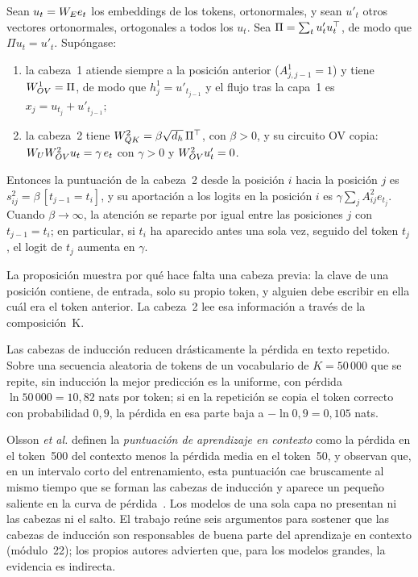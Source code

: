 \begin{proposicion}\label{prop:induccion}
Sean $u_t=W_{E} e_t$ los embeddings de los tokens, ortonormales, y sean $u'_t$ otros vectores ortonormales, ortogonales a todos los $u_t$. Sea $\Pi=\sum_tu'_tu_t^{\top}$, de modo que $\Pi u_t=u'_t$. Supóngase:
\begin{enumerate}
  \item la cabeza~1 atiende siempre a la posición anterior ($A^{1}_{j,j-1}=1$) y tiene $W_{OV}^{1}=\Pi$, de modo que $h^{1}_j=u'_{t_{j-1}}$ y el flujo tras la capa~1 es $x_j=u_{t_j}+u'_{t_{j-1}}$;
  \item la cabeza~2 tiene $W_{QK}^{2}=\beta\sqrt{d_h}\,\Pi^{\top}$, con $\beta>0$, y su circuito OV copia: $W_{U}W_{OV}^{2}u_t=\gamma\,e_t$ con $\gamma>0$ y $W_{OV}^{2}u'_t=0$.
\end{enumerate}
Entonces la puntuación de la cabeza~2 desde la posición $i$ hacia la posición $j$ es $s^{2}_{ij}=\beta\,[t_{j-1}=t_i]$, y su aportación a los logits en la posición $i$ es $\gamma\sum_jA^{2}_{ij}e_{t_j}$. Cuando $\beta\to\infty$, la atención se reparte por igual entre las posiciones $j$ con $t_{j-1}=t_i$; en particular, si $t_i$ ha aparecido antes una sola vez, seguido del token $t_j$, el logit de $t_j$ aumenta en $\gamma$.
\end{proposicion}

La proposición muestra por qué hace falta una cabeza previa: la clave de una posición contiene, de entrada, solo su propio token, y alguien debe escribir en ella cuál era el token anterior. La cabeza~2 lee esa información a través de la composición~K.

Las cabezas de inducción reducen drásticamente la pérdida en texto repetido. Sobre una secuencia aleatoria de tokens de un vocabulario de $K=50\,000$ que se repite, sin inducción la mejor predicción es la uniforme, con pérdida $\ln 50\,000=10{,}82$ nats por token; si en la repetición se copia el token correcto con probabilidad $0{,}9$, la pérdida en esa parte baja a $-\ln 0{,}9=0{,}105$ nats.

Olsson \emph{et al.} definen la \emph{puntuación de aprendizaje en contexto} como la pérdida en el token~500 del contexto menos la pérdida media en el token~50, y observan que, en un intervalo corto del entrenamiento, esta puntuación cae bruscamente al mismo tiempo que se forman las cabezas de inducción y aparece un pequeño saliente en la curva de pérdida~\cite{olsson}. Los modelos de una sola capa no presentan ni las cabezas ni el salto. El trabajo reúne seis argumentos para sostener que las cabezas de inducción son responsables de buena parte del aprendizaje en contexto (módulo~22); los propios autores advierten que, para los modelos grandes, la evidencia es indirecta.

